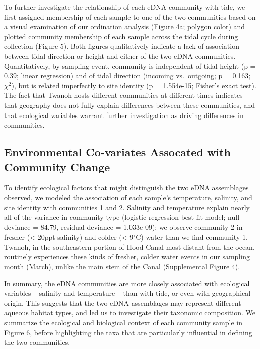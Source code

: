 \documentclass[fleqn,10pt,lineno]{wlpeerj} %
\begin{document}
To further investigate the relationship of each eDNA community with
tide, we first assigned membership of each sample to one of the two
communities based on a visual examination of our ordination analysis
(Figure 4a; polygon color) and plotted community membership of each
sample across the tidal cycle during collection (Figure 5). Both figures
qualitatively indicate a lack of association between tidal direction or
height and either of the two eDNA communities. Quantitatively, by
sampling event, community is independent of tidal height (p = 0.39;
linear regression) and of tidal direction (incoming vs.~outgoing; p =
0.163; \(\chi^2\)), but is related imperfectly to site identity (p =
1.554e-15; Fisher's exact test). The fact that Twanoh hosts different
communities at different times indicates that geography does not fully
explain differences between these communities, and that ecological
variables warrant further investigation as driving differences in
communities.

\subsection{Environmental Co-variates Assocated with Community
Change}\label{environmental-co-variates-assocated-with-community-change}

To identify ecological factors that might distinguish the two eDNA
assemblages observed, we modeled the association of each sample's
temperature, salinity, and site identity with communities 1 and 2.
Salinity and temperature explain nearly all of the variance in community
type (logistic regression best-fit model; null deviance = 84.79,
residual deviance = 1.033e-09): we observe community 2 in fresher
(\textless{} 20ppt salinity) and colder (\textless{} 9\(^\circ\)C) water
than we find community 1. Twanoh, in the southeastern portion of Hood
Canal most distant from the ocean, routinely experiences these kinds of
fresher, colder water events in our sampling month (March), unlike the
main stem of the Canal (Supplemental Figure 4).

In summary, the eDNA communities are more closely associated with
ecological variables -- salinity and temperature -- than with tide, or
even with geographical origin. This suggests that the two eDNA
assemblages may represent different aqueous habitat types, and led us to
investigate their taxonomic composition. We summarize the ecological and
biological context of each community sample in Figure 6, before
highlighting the taxa that are particularly influential in defining the
two communities.
\end{document}
